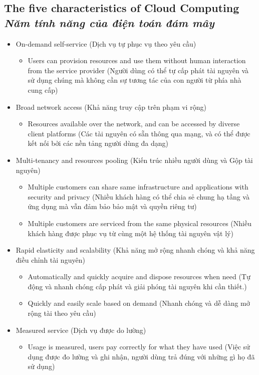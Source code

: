 \subsection[The five characteristics of Cloud Computing]{The five characteristics of Cloud Computing \\
\textit{Năm tính năng của điện toán đám mây}}
\begin{itemize}
	\item On-demand self-service (Dịch vụ tự phục vụ theo yêu cầu)
	\begin{itemize}
		\item Users can provision resources and use them without human interaction from the service provider (Người dùng có thể tự cấp phát tài nguyên và sử dụng chúng mà không cần sự tương tác của con người từ phía nhà cung cấp)
	\end{itemize}
		\item Broad network access (Khả năng truy cập trên phạm vi rộng)
	\begin{itemize}
		\item Resources available over the network, and can be accessed by diverse client platforms (Các tài nguyên có sẵn thông qua mạng, và có thể được kết nối bởi các nền tảng người dùng đa dạng)
	\end{itemize}
		\item Multi-tenancy and resources pooling (Kiến trúc nhiều người dùng và Gộp tài nguyên) 
	\begin{itemize}
		\item Multiple customers can share same infrastructure and applications with security and privacy (Nhiều khách hàng có thể chia sẻ chung hạ tầng và ứng dụng mà vẫn đảm bảo bảo mật và quyền riêng tư)
		\item Multiple customers are serviced from the same physical resources (Nhiều khách hàng được phục vụ từ cùng một hệ thống tài nguyên vật lý)	
	\end{itemize}
			\item Rapid elasticity and scalability (Khả năng mở rộng nhanh chóng và khả năng điều chỉnh tài nguyên)
	\begin{itemize}
			\item Automatically and quickly acquire and dispose resources when need (Tự động và nhanh chóng cấp phát và giải phóng tài nguyên khi cần thiết.) 
			\item Quickly and easily scale based on demand (Nhanh chóng và dễ dàng mở rộng tài theo yêu cầu)
	\end{itemize}
			\item Measured service (Dịch vụ được do lường)
	\begin{itemize}
			\item Usage is measured, users pay correctly for what they have used (Việc sử dụng được đo lường và ghi nhận, người dùng trả đúng với những gì họ đã sử dụng)
	\end{itemize} 
\end{itemize}

